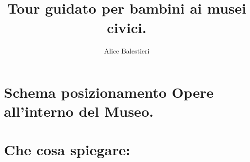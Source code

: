 \documentclass[12pt,a4paper]{article}
\begin{document}
\title{\textbf{\\Tour guidato per bambini ai musei civici.}}
\author{Alice Balestieri}
\date{}

\maketitle
\newpage

\tableofcontents
\newpage

\section{Schema posizionamento Opere all'interno del Museo.}

\section{Che cosa spiegare:}
\end{document}
